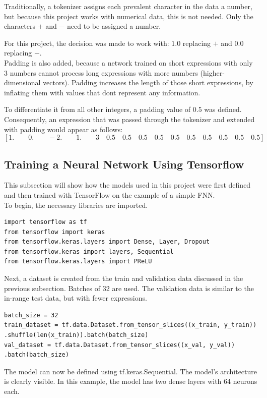 \documentclass{article}
\begin{document}
Traditionally, a tokenizer assigns each prevalent character in the data a number, but because this project works with numerical data, this is not needed. Only the characters $+$ and $-$ need to be assigned a number.

For this project, the decision was made to work with: $1.0$ replacing $+$ and $0.0$ replacing $-$.
\\[1em]
Padding is also added, because a network trained on short expressions with only 3 numbers cannot process long expressions with more numbers (higher-dimensional vectors). Padding increases the length of those short expressions, by inflating them with values that dont represent any information.

To differentiate it from all other integers, a padding value of $0.5$ was defined.
\\[1em]
Consequently, an expression that was passed through the tokenizer and extended with padding would appear as follows:
$$
[1.\qquad 0.\qquad -2.\qquad 1.\qquad 3\quad 0.5\quad 0.5\quad 0.5\quad 0.5\quad 0.5\quad 0.5\quad 0.5\quad 0.5\quad 0.5\quad 0.5]
$$
\subsection{Training a Neural Network Using Tensorflow}
This subsection will show how the models used in this project were first defined and then trained with TensorFlow on the example of a simple FNN.
\\[2em]
To begin, the necessary libraries are imported.
\begin{Verbatim}
import tensorflow as tf
from tensorflow import keras
from tensorflow.keras.layers import Dense, Layer, Dropout
from tensorflow.keras import layers, Sequential
from tensorflow.keras.layers import PReLU
\end{Verbatim}

Next, a dataset is created from the train and validation data discussed in the previous subsection. Batches of 32 are used. The validation data is similar to the in-range test data, but with fewer expressions.
\begin{Verbatim}
batch_size = 32
train_dataset = tf.data.Dataset.from_tensor_slices((x_train, y_train))
.shuffle(len(x_train)).batch(batch_size)
val_dataset = tf.data.Dataset.from_tensor_slices((x_val, y_val))
.batch(batch_size)
\end{Verbatim}

The model can now be defined using tf.keras.Sequential. The model's architecture is clearly visible. In this example, the model has two dense layers with 64 neurons each.
\end{document}
